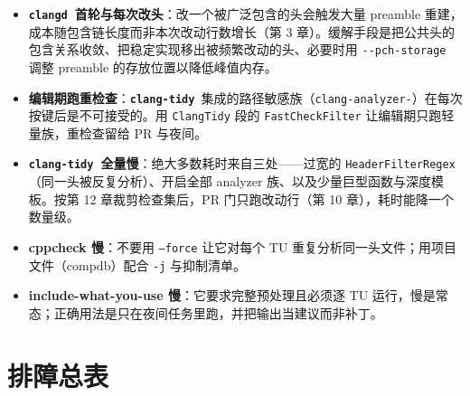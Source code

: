 \documentclass[12pt,a4paper,fontset=fandol]{ctexbook}
\newcommand{\Opt}[1]{\texttt{-\/-#1}}
\newcommand{\Lib}[1]{\textbf{\texttt{#1}}}
\newcommand{\Tidy}{\Lib{clang-tidy}}
\newcommand{\CD}{\Lib{clangd}}
\begin{document}
\begin{itemize}
  \item \textbf{\CD\ 首轮与每次改头}：改一个被广泛包含的头会触发大量 preamble 重建，成本随包含链长度而非本次改动行数增长（第 3 章）。缓解手段是把公共头的包含关系收敛、把稳定实现移出被频繁改动的头、必要时用 \Opt{pch-storage} 调整 preamble 的存放位置以降低峰值内存。
  \item \textbf{编辑期跑重检查}：\Tidy\ 集成的路径敏感族（\texttt{clang-analyzer-\allowbreak*}）在每次按键后是不可接受的。用 \texttt{ClangTidy} 段的 \texttt{FastCheckFilter} 让编辑期只跑轻量族，重检查留给 PR 与夜间。
  \item \textbf{\Tidy\ 全量慢}：绝大多数耗时来自三处——过宽的 \texttt{HeaderFilterRegex}（同一头被反复分析）、开启全部 analyzer 族、以及少量巨型函数与深度模板。按第 12 章裁剪检查集后，PR 门只跑改动行（第 10 章），耗时能降一个数量级。
  \item \textbf{cppcheck 慢}：不要用 \texttt{--force} 让它对每个 TU 重复分析同一头文件；用项目文件（compdb）配合 \texttt{-j} 与抑制清单。
  \item \textbf{include-what-you-use 慢}：它要求完整预处理且必须逐 TU 运行，慢是常态；正确用法是只在夜间任务里跑，并把输出当建议而非补丁。
\end{itemize}

\section{排障总表}\label{sec:ch17-s14}
\end{document}
